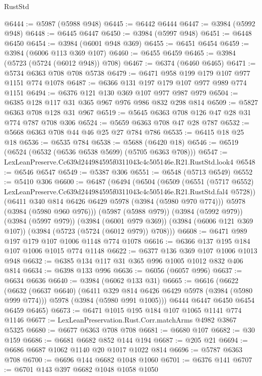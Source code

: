 \begin{lexlean}{RustStd}
\begin{coremodule}
@6444 := @5987 (@5988 @948)
@6445 := @6442 @6444
@6447 := @3984 (@5992 @948)
@6448 := @6445 @6447
@6450 := @3984 (@5997 @948)
@6451 := @6448 @6450
@6454 := @3984 (@6001 @948 @369)
@6455 := @6451 @6454
@6459 := @3984 (@6006 @113 @369 @107)
@6460 := @6455 @6459
@6465 := @3984 (@5723 (@5724 (@6012 @948)) @708)
@6467 := @6374 (@6460 @6465)
@6471 := @5734 @6363 @708 @708 @5738
@6479 := @6471 @958 @199 @179 @107 @977 @1151 @774 @1078
@6487 := @6366 @131 @197 @179 @107 @977 @989 @774 @1151
@6494 := @6376 @121 @130 @369 @107 @977 @987 @979
@6504 := @6385 @128 @117 @31 @365 @967 @976 @986 @832 @298 @814
@6509 := @5827 @6363 @708 @128 @31 @967
@6519 := @5645 @6363 @708 @126 @47 @28 @31 @774 @787 @708 @306
@6524 := @5659 @6363 @708 @47 @28 @787
@6532 := @5668 @6363 @708 @44 @46 @25 @27 @784 @786
@6535 := @6415 @18 @25 @18
@6536 := @6535 @784
@6538 := @5688 (@6420 @18)
@6546 := @6519 (@6524 (@6532 (@6536 @6538 @5699) (@5705 @6363 @708)))
@6547 := LexLeanPreserve.Cc639d244984595f0311043c4c505146e.R21.RustStd.look4
@6548 := @6546 @6547
@6549 := @5387 @306
@6551 := @6548 (@5713 @6549)
@6552 := @5410 @306
@6600 := @6487
    (@6494
      (@6504
        (@6509
          (@6551
            (@5717 @6552)
            LexLeanPreserve.Cc639d244984595f0311043c4c505146e.R21.RustStd.fal4
            @5728))
        (@6411 @340 @814 @6426 @6429 @5978 (@3984 (@5980 @970 @774)))
        @5978
        (@3984 (@5980 @960 @976)))
      (@5987 (@5988 @979))
      (@3984 (@5992 @979))
      (@3984 (@5997 @979))
      (@3984 (@6001 @979 @369))
      (@3984 (@6006 @121 @369 @107))
      (@3984 (@5723 (@5724 (@6012 @979)) @708)))
@6608 := @6471 @989 @197 @179 @107 @1006 @1148 @774 @1078
@6616 := @6366 @137 @195 @184 @107 @1006 @1015 @774 @1148
@6622 := @6377 @136 @369 @107 @1006 @1013 @948
@6632 := @6385 @134 @117 @31 @365 @996 @1005 @1012 @832 @406 @814
@6634 := @6398 @133 @996
@6636 := @6056 (@6057 @996)
@6637 := @6634 @6636
@6640 := @3984 (@6062 @133 @31)
@6665 := @6616
    (@6622
      (@6632
        (@6637 @6640)
        (@6411 @329 @814 @6426 @6429 @5978 (@3984 (@5980 @999 @774)))
        @5978
        (@3984 (@5980 @991 @1005)))
      @6444
      @6447
      @6450
      @6454
      @6459
      @6465)
@6673 := @6471 @1015 @195 @184 @107 @1065 @1141 @774 @1146
@6677 := LexLeanPreservation.Rust.Corr.matchArms @4982 @3867 @5325
@6680 := @6677 @6363 @708 @708
@6681 := @6680 @107
@6682 := @30 @159
@6686 := @6681 @6682 @852 @144 @194
@6687 := @205 @21
@6694 := @6686 @6687 @1062 @1140 @20 @1017 @1022 @814
@6696 := @5787 @6363 @708
@6700 := @6696 @144 @6682 @1048 @1060
@6701 := @6376 @141
@6707 := @6701 @143 @397 @6682 @1048 @1058 @1050

\end{coremodule}
\end{lexlean}
